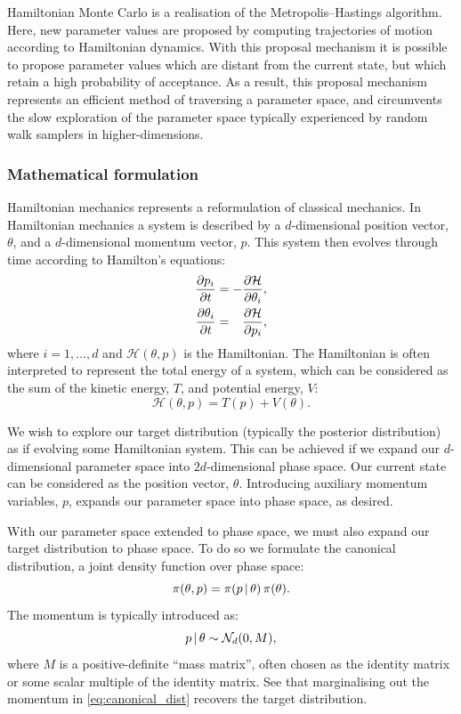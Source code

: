 Hamiltonian Monte Carlo is a realisation of the Metropolis--Hastings algorithm. Here,
new parameter values are proposed by computing trajectories of motion according to
Hamiltonian dynamics. With this proposal mechanism it is possible to propose parameter
values which are distant from the current state, but which retain a high probability of
acceptance. As a result, this proposal mechanism represents an efficient method of
traversing a parameter space, and circumvents the slow exploration of the parameter
space typically experienced by random walk samplers in higher-dimensions.

\subsubsection{Mathematical formulation}

Hamiltonian mechanics represents a reformulation of classical mechanics. In Hamiltonian
mechanics a  system is described by a $d$-dimensional position vector, $\theta$, and
a $d$-dimensional momentum vector, $p$. This system then evolves through time
according to Hamilton's equations:
\begin{align}
  \begin{split}
    \pdv{p_i}{t}      &= - \pdv{\mathcal{H}}{\theta_i},      \\
    \pdv{\theta_i}{t} &= \hphantom{-} \pdv{\mathcal{H}}{p_i},
  \end{split}
\end{align}
where $i=1,\ldots,d$ and $\mathcal{H}(\theta,  p)$ is the Hamiltonian. The Hamiltonian is often
interpreted to represent the total energy of a system, which can be considered as the sum
of the kinetic energy, $T$, and potential energy, $V$:
\begin{equation}
  \label{eq:hamiltonian_decomp}
  \mathcal{H}(\theta, p) = T(p) + V(\theta).
\end{equation}

We wish to explore our target distribution (typically the posterior distribution) as if
evolving some Hamiltonian system. This can be achieved if we expand our $d$-dimensional
parameter space into $2d$-dimensional phase space. Our current state can be considered as
the position vector, $\theta$. Introducing auxiliary momentum variables, $p$, expands
our parameter space into phase space, as desired.

With our parameter space extended to phase space, we must also expand our target
distribution to phase space. To do so we formulate the canonical distribution, a joint
density function over phase space:
\begin{equation}
  \label{eq:canonical_dist}
  \pi(\theta, p) = \pi(p \,|\,\theta) \, \pi(\theta).
\end{equation}
The momentum is typically introduced as:
\begin{equation}
  p \,|\, \theta \sim \mathcal{N}_d(0, M),
\end{equation}
where $M$ is a positive-definite ``mass matrix'', often chosen as the identity matrix or
some scalar multiple of the identity matrix. See that marginalising out the momentum in
\cref{eq:canonical_dist} recovers the target distribution.

